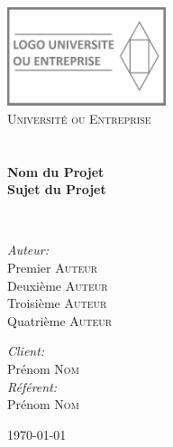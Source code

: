 \begin{titlepage}
\begin{center}

\includegraphics[width=0.35\textwidth]{./logo}~\\[1cm]

\textsc{\LARGE Université ou Entreprise}\\[1.5cm]

\textsc{\Large }\\[0.5cm]

\HRule \\[0.4cm]

{\huge \bfseries Nom du Projet\\
Sujet du Projet \\[0.4cm] }

\HRule \\[1.5cm]

\begin{minipage}{0.4\textwidth}
\begin{flushleft} \large
\emph{Auteur:}\\
Premier \textsc{Auteur}\\
Deuxième \textsc{Auteur}\\
Troisième \textsc{Auteur}\\
Quatrième \textsc{Auteur}
\end{flushleft}
\end{minipage}
\begin{minipage}{0.4\textwidth}
\begin{flushright} \large
\emph{Client:} \\
Prénom \textsc{Nom}\\
\emph{Référent:} \\
Prénom \textsc{Nom}
\end{flushright}
\end{minipage}

\vfill

{\large \today}

\end{center}
\end{titlepage}